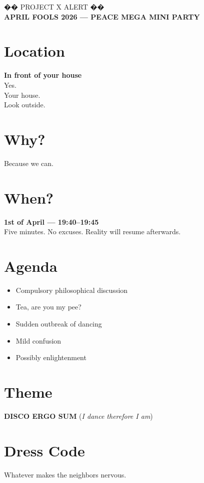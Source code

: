 \documentclass{article}
\begin{document}
\begin{center}
    \Huge \textcolor{alertred}{�� PROJECT X ALERT ��} \\
    \vspace{0.5cm}
    \LARGE \textbf{APRIL FOOLS 2026 — PEACE MEGA MINI PARTY}
\end{center}

\vspace{1cm}

\section*{Location}
\textbf{In front of your house} \\
Yes. \\
Your house. \\
Look outside.

\section*{Why?}
Because we can.

\section*{When?}
\textbf{1st of April — 19:40–19:45} \\
Five minutes. No excuses. Reality will resume afterwards.

\section*{Agenda}
\begin{itemize}[noitemsep, leftmargin=*]
    \item Compulsory philosophical discussion
    \item Tea, are you my pee?
    \item Sudden outbreak of dancing
    \item Mild confusion
    \item Possibly enlightenment
\end{itemize}

\section*{Theme}
\textbf{DISCO ERGO SUM} \quad (\textit{I dance therefore I am})

\section*{Dress Code}
Whatever makes the neighbors nervous.
\end{document}
